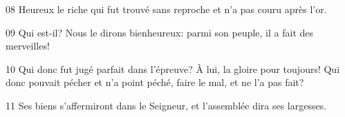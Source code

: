 08 Heureux le riche qui fut trouvé sans reproche et n’a pas couru après l’or.

09 Qui est-il? Nous le dirons bienheureux: parmi son peuple, il a fait des merveilles!

10 Qui donc fut jugé parfait dans l’épreuve? À lui, la gloire pour toujours! Qui donc pouvait pécher et n’a point péché, faire le mal, et ne l’a pas fait?

11 Ses biens s’affermiront dans le Seigneur, et l’assemblée dira ses largesses.